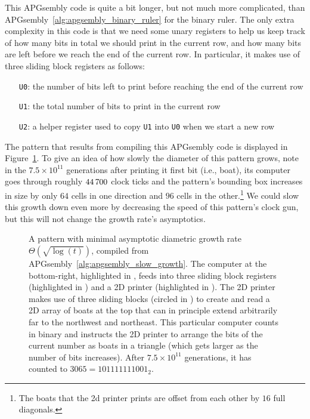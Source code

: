 This APGsembly code is quite a bit longer, but not much more complicated, than APGsembly~\ref{alg:apgsembly_binary_ruler} for the binary ruler. The only extra complexity in this code is that we need some unary registers to help us keep track of how many bits in total we should print in the current row, and how many bits are left before we reach the end of the current row. In particular, it makes use of three sliding block registers as follows:\smallskip

\begin{itemize}
	\item[\texttt{U0}:] the number of bits left to print before reaching the end of the current row
	
	\item[\texttt{U1}:] the total number of bits to print in the current row
	
	\item[\texttt{U2}:] a helper register used to copy \texttt{U1} into \texttt{U0} when we start a new row\smallskip
\end{itemize}

The pattern that results from compiling this APGsembly code is displayed in Figure~\ref{fig:osqrtlogt}. To give an idea of how slowly the diameter of this pattern grows, note in the $7.5 \times 10^{11}$ generations after printing it first bit (i.e., boat), its computer goes through roughly $44{\,}700$ clock ticks and the pattern's bounding box increases in size by only $64$ cells in one direction and $96$ cells in the other.\footnote{The boats that the 2d printer prints are offset from each other by $16$ full diagonals.} We could slow this growth down even more by decreasing the speed of this pattern's clock gun, but this will not change the growth rate's asymptotics.

\begin{figure}[!htb]
	\centering
	\caption{A pattern with minimal asymptotic diametric growth rate $\Theta(\sqrt{\log(t)})$, compiled from APGsembly~\ref{alg:apgsembly_slow_growth}. The computer at the bottom-right, highlighted in , feeds into three sliding block registers (highlighted in ) and a 2D printer (highlighted in ). The 2D printer makes use of three sliding blocks (circled in ) to create and read a 2D array of boats at the top that can in principle extend arbitrarily far to the northwest and northeast. This particular computer counts in binary and instructs the 2D printer to arrange the bits of the current number as boats in a triangle (which gets larger as the number of bits increases). After $7.5 \times 10^{11}$ generations, it has counted to $3065 = 101111111001_2$.}\label{fig:osqrtlogt}
\end{figure}

